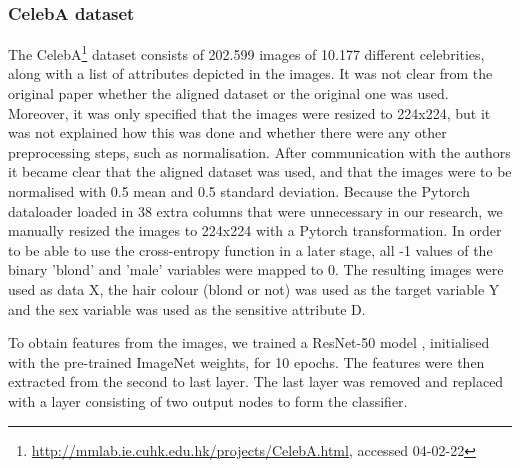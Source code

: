\subsubsection{CelebA dataset}
The CelebA\footnote{\url{http://mmlab.ie.cuhk.edu.hk/projects/CelebA.html}, accessed 04-02-22} dataset \citep{liu2015faceattributes} consists of 202.599 images of 10.177 different celebrities, along with a list of attributes depicted in the images. It was not clear from the original paper whether the aligned dataset or the original one was used. Moreover, it was only specified that the images were resized to 224x224, but it was not explained how this was done and whether there were any other preprocessing steps, such as normalisation. After communication with the authors it became clear that the aligned dataset was used, and that the images were to be normalised with 0.5 mean and 0.5 standard deviation. Because the Pytorch dataloader loaded in 38 extra columns that were unnecessary in our research, we manually resized the images to 224x224 with a Pytorch transformation. In order to be able to use the cross-entropy function in a later stage, all -1 values of the binary 'blond' and 'male' variables were mapped to 0. The resulting images were used as data X, the hair colour (blond or not) was used as the target variable Y and the sex variable was used as the sensitive attribute D.

To obtain features from the images, we trained a ResNet-50 model \citep{7780459}, initialised with the pre-trained ImageNet weights, for 10 epochs. The features were then extracted from the second to last layer. The last layer was removed and replaced with a layer consisting of two output nodes to form the classifier. 


